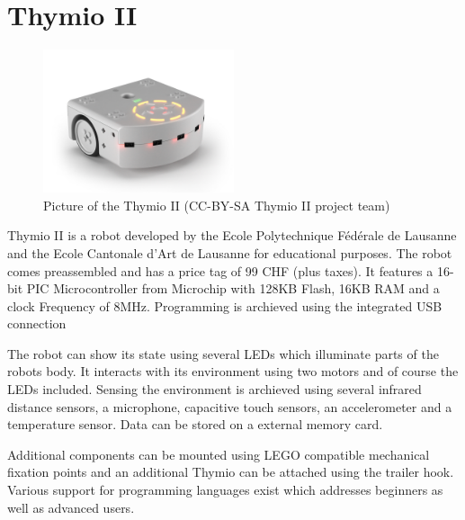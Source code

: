 \section{Thymio II}
\begin{figure}[H]
  \centering
  \includegraphics[width=0.5\textwidth]{images/thymioii.jpg}
  \caption{Picture of the Thymio II (CC-BY-SA Thymio II project team)}
\end{figure}

Thymio II is a robot developed by the Ecole Polytechnique Fédérale de Lausanne and the Ecole Cantonale d'Art de Lausanne for educational purposes. The robot comes preassembled and has a price tag of 99 CHF (plus taxes). It features a 16-bit PIC Microcontroller from Microchip with 128KB Flash, 16KB RAM and a clock Frequency of 8MHz. Programming is archieved using the integrated USB connection

The robot can show its state using several LEDs which illuminate parts of the robots body. It interacts with its environment using two motors and of course the LEDs included. Sensing the environment is archieved using several infrared distance sensors, a microphone, capacitive touch sensors, an accelerometer and a temperature sensor. Data can be stored on a external memory card.

Additional components can be mounted using LEGO compatible mechanical fixation points and an additional Thymio can be attached using the trailer hook. Various support for programming languages exist which addresses beginners as well as advanced users.\cite{riedo2013thymio}


